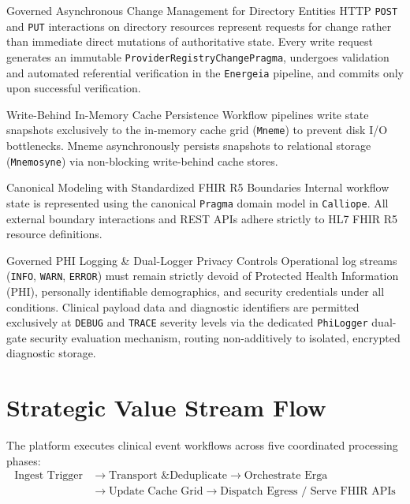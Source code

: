 \begin{principlebox}{Governed Asynchronous Change Management for Directory Entities}
HTTP \texttt{POST} and \texttt{PUT} interactions on directory resources represent requests for change rather than immediate direct mutations of authoritative state. Every write request generates an immutable \texttt{ProviderRegistryChangePragma}, undergoes validation and automated referential verification in the \texttt{Energeia} pipeline, and commits only upon successful verification.
\end{principlebox}

\begin{principlebox}{Write-Behind In-Memory Cache Persistence}
Workflow pipelines write state snapshots exclusively to the in-memory cache grid (\texttt{Mneme}) to prevent disk I/O bottlenecks. Mneme asynchronously persists snapshots to relational storage (\texttt{Mnemosyne}) via non-blocking write-behind cache stores.
\end{principlebox}

\begin{principlebox}{Canonical Modeling with Standardized FHIR R5 Boundaries}
Internal workflow state is represented using the canonical \texttt{Pragma} domain model in \texttt{Calliope}. All external boundary interactions and REST APIs adhere strictly to HL7 FHIR R5 resource definitions.
\end{principlebox}

\begin{principlebox}{Governed PHI Logging \& Dual-Logger Privacy Controls}
Operational log streams (\texttt{INFO}, \texttt{WARN}, \texttt{ERROR}) must remain strictly devoid of Protected Health Information (PHI), personally identifiable demographics, and security credentials under all conditions. Clinical payload data and diagnostic identifiers are permitted exclusively at \texttt{DEBUG} and \texttt{TRACE} severity levels via the dedicated \texttt{PhiLogger} dual-gate security evaluation mechanism, routing non-additively to isolated, encrypted diagnostic storage.
\end{principlebox}

\section{Strategic Value Stream Flow}

The platform executes clinical event workflows across five coordinated processing phases:
\begin{equation*}
\begin{aligned}
\text{Ingest Trigger} &\longrightarrow \text{Transport \& Deduplicate} \longrightarrow \text{Orchestrate Erga} \\
                      &\longrightarrow \text{Update Cache Grid} \longrightarrow \text{Dispatch Egress / Serve FHIR APIs}
\end{aligned}
\end{equation*}

\newpage
